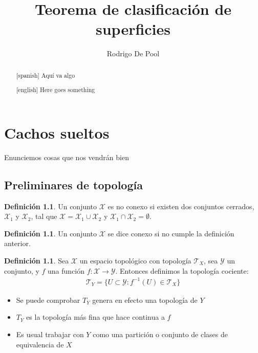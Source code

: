 \documentclass[a4paper,11pt,spanish, twoside, leqno]{tfg-uam}
\title{Teorema de clasificación de superficies}
\author{Rodrigo De Pool}
\theoremstyle{definition}
\newtheorem{defin}[teor]{Definici\'on}
\begin{document}
\begin{abstract}[spanish]
Aquí va algo
\end{abstract}
\begin{abstract}[english]
Here goes something
\end{abstract}


\mainmatter
\chapter{Cachos sueltos}



Enunciemos cosas que nos vendrán bien

\section{Preliminares de topología}


\begin{defin}\label{defin:noconexo}
	Un conjunto $\mathcal{X}$ es no conexo si existen dos  conjuntos cerrados, $\mathcal{X}_1$ y $\mathcal{X}_2$, tal que $\mathcal{X}=\mathcal{X}_1\cup\mathcal{X}_2$ y $\mathcal{X}_1\cap\mathcal{X}_2=\emptyset$.
\end{defin}


\begin{defin}\label{defin:conexo}
	Un conjunto $\mathcal{X}$ se dice conexo si no cumple la definición anterior.
\end{defin}



\begin{defin}\label{defin:topologiaCociente}
	Sea $\mathcal{X}$ un espacio topológico con topología $\mathcal{T}_X$, sea $\mathcal{Y}$ un conjunto, y $f$ una función  $f:\mathcal{X}\longrightarrow\mathcal{Y}$. Entonces definimos la topología cociente:
	\begin{align*}
	\mathcal{T}_Y = \{U\subset\mathcal{Y}: f^{-1}(U)\in\mathcal{T}_X\}
	\end{align*} 
	\begin{itemize}
		\item 
		Se puede comprobar $T_Y$ genera en efecto una topología de $Y$
		\item
		$T_Y$ es la topología más fina que hace continua a $f$
		\item 
		Es usual trabajar con $Y$ como una partición o conjunto de clases de equivalencia de $X$
	\end{itemize}
\end{defin}
\end{document}
